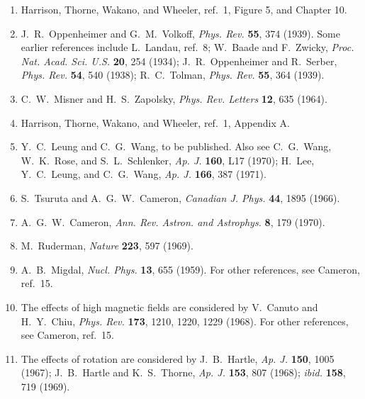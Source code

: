 \begin{enumerate}
  \item {}\label{ch11-ref-9}
  Harrison, Thorne, Wakano, and Wheeler, ref.~1, Figure 5, and Chapter 10.

  \item {}\label{ch11-ref-10}
  J.~R.~Oppenheimer and G.~M.~Volkoff, \emph{Phys. Rev.} \textbf{55}, 374
  (1939). Some earlier references include L.~Landau, ref.~8;
  W.~Baade and F.~Zwicky, \emph{Proc. Nat. Acad. Sci. U.S.} \textbf{20},
  254 (1934); J.~R.~Oppenheimer and R.~Serber, \emph{Phys. Rev.}
  \textbf{54}, 540 (1938); R.~C.~Tolman, \emph{Phys. Rev.} \textbf{55},
  364 (1939).

  \item {}\label{ch11-ref-11}
  C.~W.~Misner and H.~S.~Zapolsky, \emph{Phys. Rev. Letters} \textbf{12},
  635 (1964).

  \item {}\label{ch11-ref-12}
  Harrison, Thorne, Wakano, and Wheeler, ref.~1, Appendix A.

  \item {}\label{ch11-ref-13}
  Y.~C.~Leung and C.~G.~Wang, to be published. Also see C.~G.~Wang,
  W.~K.~Rose, and S.~L.~Schlenker, \emph{Ap. J.} \textbf{160}, L17
  (1970); H.~Lee, Y.~C.~Leung, and C.~G.~Wang, \emph{Ap. J.}
  \textbf{166}, 387 (1971).

  \item {}\label{ch11-ref-14}
  S.~Tsuruta and A.~G.~W.~Cameron, \emph{Canadian J. Phys.} \textbf{44},
  1895 (1966).

  \item {}\label{ch11-ref-15}
  A.~G.~W.~Cameron, \emph{Ann. Rev. Astron. and Astrophys.} \textbf{8},
  179 (1970).

  \item {}\label{ch11-ref-16}
  M.~Ruderman, \emph{Nature} \textbf{223}, 597 (1969).

  \item {}\label{ch11-ref-17}
  A.~B.~Migdal, \emph{Nucl. Phys.} \textbf{13}, 655 (1959). For other
  references, see Cameron, ref.~15.

  \item {}\label{ch11-ref-18}
  The effects of high magnetic fields are considered by V.~Canuto and
  H.~Y.~Chiu, \emph{Phys. Rev.} \textbf{173}, 1210, 1220, 1229 (1968).
  For other references, see Cameron, ref.~15.

  \item {}\label{ch11-ref-19}
  The effects of rotation are considered by J.~B.~Hartle, \emph{Ap. J.}
  \textbf{150}, 1005 (1967); J.~B.~Hartle and K.~S.~Thorne,
  \emph{Ap. J.} \textbf{153}, 807 (1968); \emph{ibid.} \textbf{158}, 719
  (1969).


\end{enumerate}
